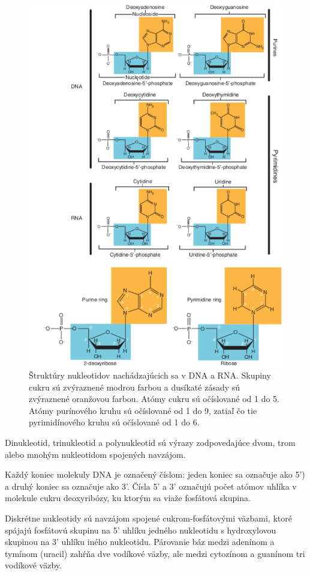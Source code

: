 \begin{figure}[!ht]
	\centering
	\includegraphics[width=.9\textwidth]{figures/bases1.png}
	\caption{Štruktúry nukleotidov nachádzajúcich sa v DNA a RNA. Skupiny cukru sú zvýraznené modrou farbou a dusíkaté zásady sú zvýraznené oranžovou farbou.
	Atómy cukru sú očíslované od 1 do 5. Atómy purínového kruhu sú očíslované od 1 do 9, zatiaľ čo tie pyrimidínového kruhu sú očíslované od 1 do 6. \label{o:nucleotides}}
\end{figure}

Dinukleotid, trinukleotid a polynukleotid sú výrazy zodpovedajúce dvom, trom alebo mnohým nukleotidom spojených navzájom.

Každý koniec molekuly DNA je označený číslom: jeden koniec sa označuje ako 5') a druhý koniec sa označuje ako 3'. 
Čísla 5' a 3' označujú počet atómov uhlíka v molekule cukru deoxyribózy, ku ktorým sa viaže fosfátová skupina.

Diskrétne nukleotidy sú navzájom spojené cukrom-fosfátovými väzbami, ktoré spájajú fosfátovú skupinu na 5' uhlíku jedného nukleotidu s hydroxylovou skupinou na 3' uhlíku iného nukleotidu.
Párovanie báz medzi adenínom a tymínom (uracil) zahŕňa dve vodíkové väzby, ale medzi cytozínom a guanínom tri vodíkové väzby. 


